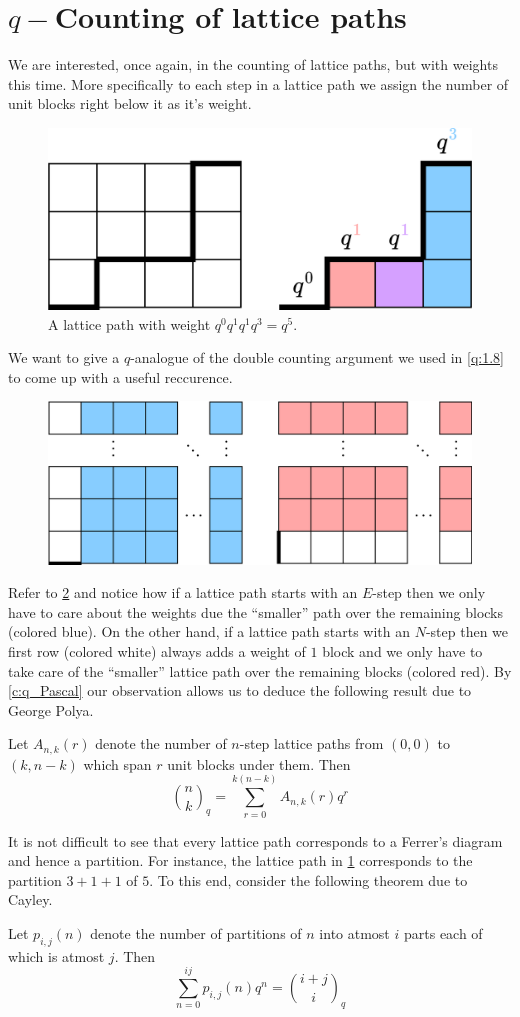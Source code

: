 \section{\texorpdfstring{$q-$}-Counting of lattice paths}
We are interested, once again, in the counting of lattice paths, but with weights this time. More specifically to each step in a lattice path we assign the number of unit blocks right below it as it's weight. 
\begin{figure}[H]
    \centering
    \includegraphics[width=0.65\linewidth]{Images/Figure27.png}
    \caption{A lattice path with weight $q^0q^1q^1q^3=q^5$.}
    \label{f:F2L}
\end{figure}
We want to give a $q$-analogue of the double counting argument we used in \cref{q:1.8} to come up with a useful reccurence. 
\begin{figure}[H]
    \centering
    \includegraphics[width=0.65\linewidth]{Images/Figure28.png}
    \caption{}
    \label{fig:Cayley_Rec}
\end{figure}
Refer to \cref{fig:Cayley_Rec} and notice how if a lattice path starts with an $E$-step then we only have to care about the weights due the ``smaller'' path over the remaining blocks (colored blue). On the other hand, if a lattice path starts with an $N$-step then we first row (colored white) always adds a weight of $1$ block and we only have to take care of the ``smaller'' lattice path over the remaining blocks (colored red). By \cref{c:q_Pascal} our observation allows us to deduce the following result due to George Polya.
\begin{theorem}
Let $A_{n,k}(r)$ denote the number of $n$-step lattice paths from $(0,0)$ to $(k,n-k)$ which span $r$ unit blocks under them. Then 
\[
\binom{n}{k}_q = \sum_{r=0}^{k(n-k)}A_{n,k}(r)q^r
\]
\end{theorem}
It is not difficult to see that every lattice path corresponds to a Ferrer's diagram and hence a partition. For instance, the lattice path in \cref{f:F2L} corresponds to the partition $3+1+1$ of $5$. To this end, consider the following theorem due to Cayley.
\begin{theorem}
Let $p_{i,j}\left( n \right)$ denote the number of partitions of $n$ into atmost $i$ parts each of which is atmost $j$. Then \[
	\sum_{n=0}^{ij}p_{i,j}\left( n \right) q^n = \binom{i+j}{i}_q 
\]     
\end{theorem}

\endinput
